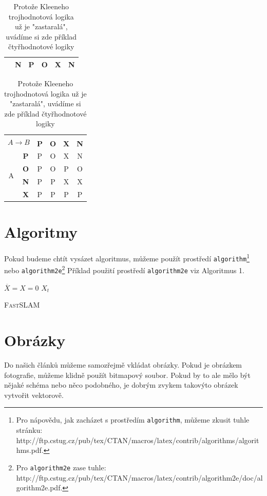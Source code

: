 \documentclass[11pt,a4paper,onecolumn]{article}
\begin{document}
\begin{table}[ht]
\begin{center}
\begin{tabular}[p]{|c|>{\bfseries}c|c|c|c|c|}
  & N & P & O & X & N\\\hline
\end{tabular}
\begin{tabular}[p]{|c|>{\bfseries}c|c|c|c|c|}\hline
\multicolumn{2}{|c|}{\multirow{2}{*}{$A \rightarrow B$}} & \multicolumn{4}{c|}{$B$} \\\cline{3-6}
\multicolumn{2}{|c|}{} & \textbf{P} & \textbf{O} & \textbf{X} & \textbf{N}  \\\hline
\multirow{4}{*}{A} 
  & P & P & O & X & N\\\cline{2-6}
  & O & P & O & P & O\\\cline{2-6}
  & N & P & P & X & X\\\cline{2-6}
  & X & P & P & P & P\\\hline
\end{tabular}
\caption{Protože Kleeneho trojhodnotová logika už je "zastaralá", uvádíme si zde příklad čtyřhodnotové logiky}
\end{center}
\end{table}
\section{Algoritmy}
\noindent Pokud budeme chtít vysázet algoritmus, můžeme použít prostředí \texttt{algorithm}\footnote{Pro nápovědu, jak zacházet s prostředím \texttt{algorithm}, můžeme zkusit tuhle stránku: http://ftp.cstug.cz/pub/tex/CTAN/macros/latex/contrib/algorithms/algorithms.pdf.}
nebo \texttt{algorithm2e}\footnote{Pro \texttt{algorithm2e} zase tuhle: http://ftp.cstug.cz/pub/tex/CTAN/macros/latex/contrib/algorithm2e/doc/algorithm2e.pdf.}
Příklad použití prostředí \texttt{algorithm2e} viz Algoritmus 1.

\IncMargin{1em}
\begin{algorithm}[H]
\DontPrintSemicolon
\SetNlSty{}{}{:}
$\overline{X} = X = 0$ \;
\KwRet $X_t$\;
\caption{\textsc{FastSLAM}}
\end{algorithm}
\DecMargin{1em}
\bigskip


\section{Obrázky}
\noindent Do našich článků můžeme samozřejmě vkládat obrázky. Pokud je obrázkem fotografie, můžeme klidně použít bitmapový soubor. Pokud by to ale mělo být nějaké schéma nebo něco podobného, je dobrým zvykem takovýto obrázek vytvořit vektorově.
\end{document}
